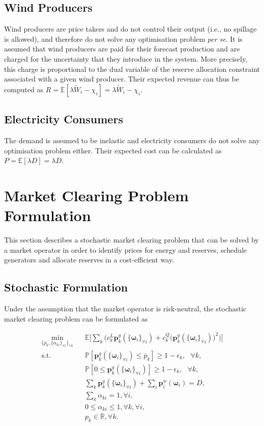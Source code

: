 \documentclass{article}
\begin{document}
\subsection{Wind Producers}

Wind producers are price takers and do not control their output (i.e., no spillage is allowed), and therefore do not solve any optimisation problem \textit{per se}. It is assumed that wind producers are paid for their forecast production and are charged for the uncertainty that they introduce in the system. More precisely, this charge is proportional to the dual variable of the reserve allocation constraint associated with a given wind producer. Their expected revenue can thus be computed as $R = \mathbb{E}[\lambda \tilde{W}_i - \chi_i] = \lambda \tilde{W}_i - \chi_i$.

\subsection{Electricity Consumers}

The demand is assumed to be inelastic and electricity consumers do not solve any optimisation problem either. Their expected cost can be calculated as $P = \mathbb{E}[\lambda D] = \lambda D$.

\section{Market Clearing Problem Formulation}

This section describes a stochastic market clearing problem that can be solved by a market operator in order to identify prices for energy and reserves, schedule generators and allocate reserves in a cost-efficient way. 

\subsection{Stochastic Formulation}
Under the assumption that the market operator is risk-neutral, the stochastic market clearing problem can be formulated as

\begin{align}
\underset{\{p_k, \{\alpha_{ki}\}_{\forall i}\}_{\forall k}}{\min} \hspace{10pt} & \mathbb{E}\Big[\sum_k \big(c_k^L \mathbf{p}_k^g(\{\boldsymbol{\omega}_i\}_{\forall i}) + c_k^Q \big(\mathbf{p}_k^g(\{\boldsymbol{\omega}_i\}_{\forall i})\big)^2\big)\Big]\\
\mbox{s.t. } & \mathbb{P}[\mathbf{p}_k^g(\{\boldsymbol{\omega}_i\}_{\forall i}) \le \overline{p}_k] \ge 1 - \epsilon_k, \mbox{ }\forall k,\\
& \mathbb{P}[0 \le \mathbf{p}_k^g(\{\boldsymbol{\omega}_i\}_{\forall i})] \ge 1 - \epsilon_k, \mbox{ }\forall k,\\
& \sum_k \mathbf{p}_k^g(\{\boldsymbol{\omega}_i\}_{\forall i}) + \sum_i \mathbf{p}_i^w(\boldsymbol{\omega}_i) = D,\\
& \sum_k \alpha_{ki} = 1, \forall i,\\
& 0 \le \alpha_{ki} \le 1, \forall k, \forall i,\\
& p_k \in \mathbb{R}, \forall k.
\end{align}
\end{document}
